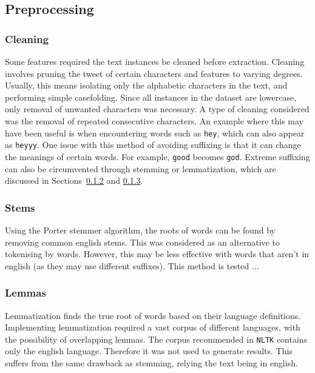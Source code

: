 \documentclass[11pt]{article}
\begin{document}
\subsection{Preprocessing}

\subsubsection{Cleaning}
Some features required the text instances be cleaned before extraction.
Cleaning involves pruning the tweet of certain characters and features to varying degrees.
Usually, this means isolating only the alphabetic characters in the text, and performing simple casefolding.
Since all instances in the dataset are lowercase, only removal of unwanted characters was necessary.
A type of cleaning considered was the removal of repeated consecutive characters.
An example where this may have been useful is when encountering words such as \texttt{hey}, which can also appear as \texttt{heyyy}.
One issue with this method of avoiding suffixing is that it can change the meanings of certain words. For example, \texttt{good} becomes \texttt{god}.
Extreme suffixing can also be circumvented through stemming or lemmatization, which are discussed in Sections~\ref{sec:stems} and \ref{sec:lemmas}.


\subsubsection{Stems}\label{sec:stems}
Using the Porter stemmer algorithm, the roots of words can be found by removing common english stems. 
This was considered as an alternative to tokenising by words. 
However, this may be less effective with words that aren't in english (as they may use different suffixes).
This method is tested ...

\subsubsection{Lemmas}\label{sec:lemmas}
Lemmatization finds the true root of words based on their language definitions.
Implementing lemmatization required a vast corpus of different languages, 
with the possibility of overlapping lemmas. 
The corpus recommended in \texttt{NLTK} contains only the english language. 
Therefore it was not used to generate results.
This suffers from the same drawback as stemming, relying the text being in english.
\end{document}
